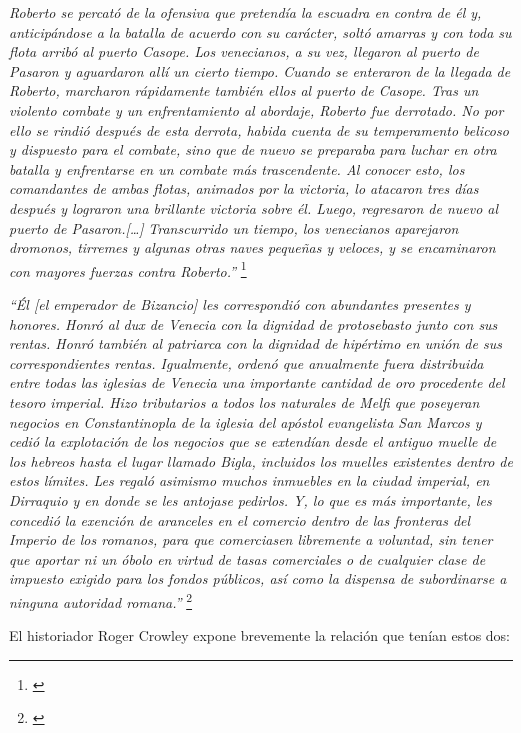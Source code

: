\textit{Roberto se percató de la ofensiva que pretendía la escuadra en contra 
de él y, anticipándose a la batalla de acuerdo con su carácter, soltó 
amarras y con toda su flota arribó al puerto Casope. Los venecianos, 
a su vez, llegaron al puerto de Pasaron y aguardaron allí un cierto 
tiempo. Cuando se enteraron de la llegada de Roberto, marcharon 
rápidamente también ellos al puerto de Casope. Tras un violento 
combate y un enfrentamiento al abordaje, Roberto fue derrotado. 
No por ello se rindió después de esta derrota, habida cuenta de su 
temperamento belicoso y dispuesto para el combate, sino que de nuevo 
se preparaba para luchar en otra batalla y enfrentarse en un 
combate más trascendente. Al conocer esto, los comandantes de ambas 
flotas, animados por la victoria, lo atacaron tres días después y 
lograron una brillante victoria sobre él. Luego, regresaron de 
nuevo al puerto de Pasaron.[…]
}
\textit{Transcurrido un tiempo, los venecianos aparejaron dromonos, 
tirremes y algunas otras naves pequeñas y veloces, y se 
encaminaron con mayores fuerzas contra Roberto.”
}\footnote{\cite[pp.~250--252]{alexiadaVI}}

\textit{“Él [el emperador de Bizancio] les correspondió con 
abundantes presentes y honores.
Honró al dux de Venecia con la dignidad de protosebasto junto con 
sus rentas. Honró también al patriarca con la dignidad de hipértimo en 
unión de sus correspondientes rentas. Igualmente, ordenó que anualmente 
fuera distribuida entre todas las iglesias de Venecia una importante 
cantidad de oro procedente del tesoro imperial. Hizo tributarios a todos los 
naturales de Melfi que poseyeran negocios en Constantinopla de la 
iglesia del apóstol evangelista San Marcos y cedió la explotación de 
los negocios que se extendían desde el antiguo muelle de los hebreos 
hasta el lugar llamado Bigla, incluidos los muelles existentes dentro 
de estos límites. Les regaló asimismo muchos inmuebles en la ciudad 
imperial, en Dirraquio y en donde se les antojase pedirlos. Y, lo que 
es más importante, les concedió la exención de aranceles en el comercio 
dentro de las fronteras del Imperio de los romanos, para que comerciasen 
libremente a voluntad, sin tener que aportar ni un óbolo en virtud de tasas 
comerciales o de cualquier clase de impuesto exigido para los fondos 
públicos, así como la dispensa de subordinarse a ninguna autoridad romana.”
}\footnote{\cite[p.~252]{alexiadaVI}}

El historiador Roger Crowley expone brevemente la relación 
que tenían estos dos:

